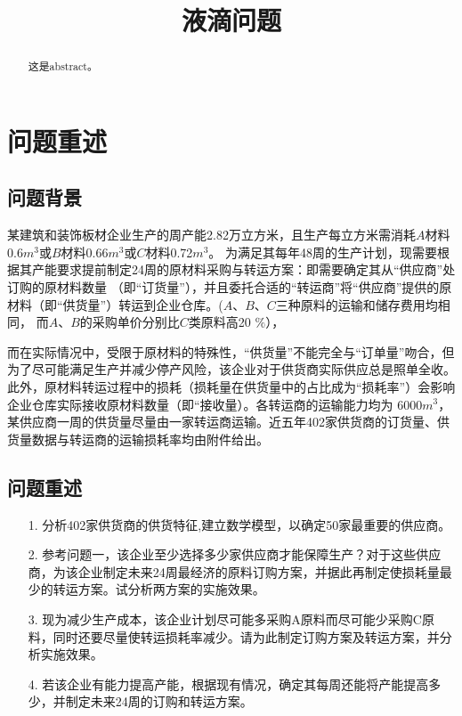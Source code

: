 \documentclass{cumcmthesis}
\title{液滴问题}\tihao{A}
\begin{document}
\maketitle

\begin{abstract}
    这是abstract。

\end{abstract}

\section{问题重述}
\subsection{问题背景}
某建筑和装饰板材企业生产的周产能2.82万立方米，且生产每立方米需消耗$A$材料0.6$m^{3}$或$B$材料0.66$m^{3}$或$C$材料0.72$m^{3}$。
为满足其每年48周的生产计划，现需要根据其产能要求提前制定24周的原材料采购与转运方案：即需要确定其从“供应商”处订购的原材料数量
（即“订货量”），并且委托合适的“转运商”将“供应商”提供的原材料（即“供货量”）转运到企业仓库。($A$、$B$、$C$三种原料的运输和储存费用均相同，
而$A$、$B$的采购单价分别比$C$类原料高20 $\%$），\par
而在实际情况中，受限于原材料的特殊性，“供货量”不能完全与“订单量”吻合，但为了尽可能满足生产并减少停产风险，该企业对于供货商实际供应总是照单全收。
此外，原材料转运过程中的损耗（损耗量在供货量中的占比成为“损耗率”）会影响企业仓库实际接收原材料数量（即“接收量）。各转运商的运输能力均为
6000$m^{3}$，某供应商一周的供货量尽量由一家转运商运输。近五年402家供货商的订货量、供货量数据与转运商的运输损耗率均由附件给出。\par
\subsection{问题重述}
\begin{enumerate}
    \item [1.] 分析402家供货商的供货特征,建立数学模型，以确定50家最重要的供应商。
    \item [2.] 参考问题一，该企业至少选择多少家供应商才能保障生产？对于这些供应商，为该企业制定未来24周最经济的原料订购方案，并据此再制定使损耗量最少的转运方案。试分析两方案的实施效果。
    \item [3.] 现为减少生产成本，该企业计划尽可能多采购A原料而尽可能少采购C原料，同时还要尽量使转运损耗率减少。请为此制定订购方案及转运方案，并分析实施效果。
    \item [4.] 若该企业有能力提高产能，根据现有情况，确定其每周还能将产能提高多少，并制定未来24周的订购和转运方案。
\end{enumerate}
\end{document}
